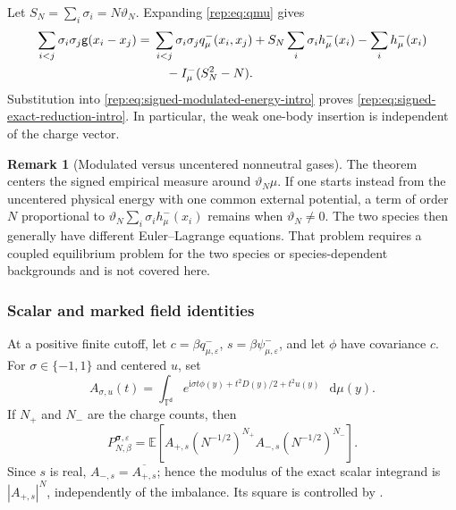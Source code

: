 \documentclass[11pt,reqno]{amsart}
\numberwithin{equation}{section}
\theoremstyle{plain}
\theoremstyle{definition}
\newtheorem{remark}[remark]{Remark}
\renewcommand{\d}{\mathsf d}
\newcommand{\dd}{\mathop{}\!\mathrm d}
\newcommand{\T}{\mathbb T}
\newcommand{\E}{\mathbb E}
\newcommand{\be}{\beta}
\newcommand{\vep}{\varepsilon}
\newcommand{\g}{\mathsf g}
\begin{document}
Let $S_N=\sum_i\sigma_i=N\vartheta_N$.  Expanding \eqref{rep:eq:qmu} gives
\begin{align}
 \sum_{i<j}\sigma_i\sigma_j\g(x_i-x_j)
 ={}&\sum_{i<j}\sigma_i\sigma_jq^-_\mu(x_i,x_j)
 +S_N\sum_i\sigma_i h^-_\mu(x_i)-\sum_i h^-_\mu(x_i)\notag\\
 &\quad-I^-_\mu(S_N^2-N).
 \label{rep:eq:signed-pair-decomposition}
\end{align}
Substitution into \eqref{rep:eq:signed-modulated-energy-intro} proves \eqref{rep:eq:signed-exact-reduction-intro}.  In particular, the weak one-body insertion is independent of the charge vector.

\begin{remark}[Modulated versus uncentered nonneutral gases]\label{rep:rem:modulated-versus-physical}
The theorem centers the signed empirical measure around $\vartheta_N\mu$.  If one starts instead from the uncentered physical energy with one common external potential, a term of order $N$ proportional to $\vartheta_N\sum_i\sigma_i h^-_\mu(x_i)$ remains when $\vartheta_N\ne0$.  The two species then generally have different Euler--Lagrange equations.  That problem requires a coupled equilibrium problem for the two species or species-dependent backgrounds and is not covered here.
\end{remark}

\subsubsection{Scalar and marked field identities}

At a positive finite cutoff, let $c=\be q^-_{\mu,\vep}$, $s=\be\psi^-_{\mu,\vep}$, and let $\phi$ have covariance $c$.  For $\sigma\in\{-1,1\}$ and centered $u$, set
\begin{equation}\label{rep:eq:A-sigma-arbitrary}
 A_{\sigma,u}(t)=\int_{\T^{\d}}
 e^{\mathrm{i}\sigma t\phi(y)+t^2D(y)/2+t^2u(y)}\,\dd\mu(y).
\end{equation}
If $N_+$ and $N_-$ are the charge counts, then
\begin{equation}\label{rep:eq:arbitrary-scalar-field}
 P_{N,\be}^{\boldsymbol\sigma,\vep}
 =\E\left[A_{+,s}(N^{-1/2})^{N_+}
 A_{-,s}(N^{-1/2})^{N_-}\right].
\end{equation}
Since $s$ is real, $A_{-,s}=\overline{A_{+,s}}$; hence the modulus of the exact scalar integrand is $|A_{+,s}|^N$, independently of the imbalance.  Its square is controlled by .
\end{document}
